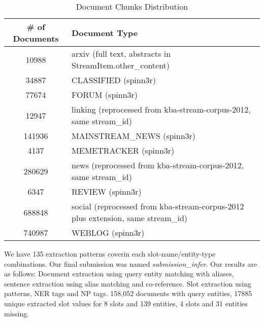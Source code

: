  
\begin{table*}
\caption{Document Chunks Distribution }
\centering
\label{table:documentsDist}

\begin{tabular}{|c|l|}
\hline 
\textbf{\# of Documents} & \textbf{Document Type}\\ 
\hline 
10988 & 	arxiv (full text, abstracts in StreamItem.other\_content) \\ \hline
34887 & CLASSIFIED (spinn3r)  \\ \hline
77674 & FORUM (spinn3r)  \\ \hline
12947 & linking (reprocessed from kba-stream-corpus-2012, same stream\_id)  \\ \hline
141936 & MAINSTREAM\_NEWS (spinn3r)  \\ \hline
4137 & MEMETRACKER (spinn3r)  \\ \hline
280629 & news (reprocessed from kba-stream-corpus-2012, same stream\_id)  \\ \hline
6347 &  REVIEW (spinn3r) \\ \hline
688848 & 	 social (reprocessed from kba-stream-corpus-2012 plus extension, same stream\_id)  \\ \hline
740987 & WEBLOG (spinn3r)  \\ \hline

  
\hline 
\end{tabular} 
\end{table*}


 
 
 
We have 135 extraction patterns coverin each slot-name/entity-type combinations. Our final submission was named \textit{submission\_infer}. Our results are as follows: Document extraction using query entity matching with aliases, sentence extraction using alias matching and co-reference. Slot extraction using patterns, NER tags and NP tags. 158,052 documents with query entities, 17885 unique extracted slot values for 8 slots and 139 entities, 4 slots and 31 entities missing.

